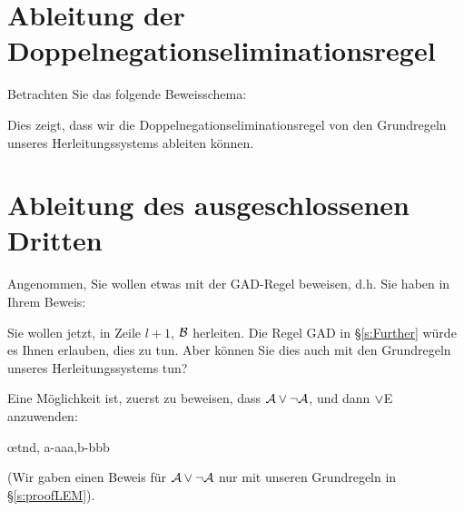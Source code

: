 \section{Ableitung der Doppelnegationseliminationsregel}
Betrachten Sie das folgende Beweisschema:
	\begin{fitchproof}
	\open
	\close
\end{fitchproof}
Dies zeigt, dass wir die Doppelnegationseliminationsregel von den Grundregeln unseres Herleitungssystems ableiten können.

\section{Ableitung des ausgeschlossenen Dritten}
Angenommen, Sie wollen etwas mit der GAD-Regel beweisen, d.h. Sie haben in Ihrem Beweis:
\begin{fitchproof}
  \open
  \close
  \open
  \close
\end{fitchproof}
Sie wollen jetzt, in Zeile $l+1$, $\mathcal{B}$ herleiten. Die Regel GAD in \S\ref{s:Further} würde es Ihnen erlauben, dies zu tun. Aber können Sie dies auch mit den Grundregeln unseres Herleitungssystems tun?

Eine Möglichkeit ist, zuerst zu beweisen, dass $\mathcal{A} \vee \neg\mathcal{A}$, und dann $\vee$E anzuwenden:
\begin{fitchproof}
  \open
  \close
  \open
  \close
  \ellipsesline
  \oe{tnd, a-aaa,b-bbb}
\end{fitchproof}
(Wir gaben einen Beweis für $\mathcal{A} \vee \neg\mathcal{A}$ nur mit unseren Grundregeln in \S\ref{s:proofLEM}).


